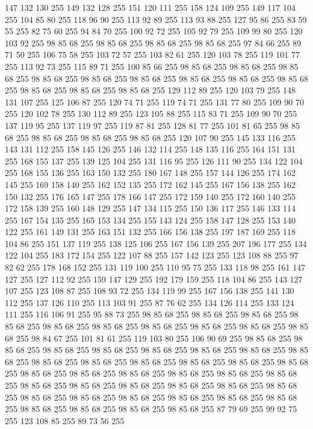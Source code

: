 147 132 130 255 149 132 128 255 151 120 111 255 158 124 109 255 149 117 104 255 104 85 80 255 118 96 90 255 113 92 89 255 113 93 88 255 127 95 86 255 83 59 55 255 82 75 60 255 94 84 70 255 100 92 72 255 105 92 79 255 109 99 80 255 120 103 92 255 98 85 68 255 98 85 68 255 98 85 68 255 98 85 68 255 97 84 66 255 89 71 50 255 106 75 58 255 103 72 57 255 103 82 61 255 120 103 78 255 119 101 77 255 113 92 73 255 115 89 71 255 100 85 66 255 98 85 68 255 98 85 68 255 98 85 68 255 98 85 68 255 98 85 68 255 98 85 68 255 98 85 68 255 98 85 68 255 98 85 68 255 98 85 68 255 98 85 68 255 98 85 68 255 129 112 89 255 120 103 79 255 148 131 107 255 125 106 87 255 120 74 71 255 119 74 71 255 131 77 80 255 109 90 70 255 120 102 78 255 130 112 89 255 123 105 88 255 115 83 71 255 109 90 70 255 137 119 95 255 137 119 97 255 119 87 81 255 128 81 77 255 101 81 65 255 98 85 68 255 98 85 68 255 98 85 68 255
98 85 68 255 120 107 90 255 145 133 116 255 143 131 112 255 158 145 126 255 146 132 114 255 148 135 116 255 164 151 131 255 168 155 137 255 139 125 104 255 131 116 95 255 126 111 90 255 134 122 104 255 168 155 136 255 163 150 132 255 180 167 148 255 157 144 126 255 174 162 145 255 169 158 140 255 162 152 135 255 172 162 145 255 167 156 138 255 162 150 132 255 176 165 147 255 178 166 147 255 172 159 140 255 172 160 140 255 172 158 139 255 160 148 129 255 147 134 115 255 150 136 117 255 146 133 114 255 167 154 135 255 165 153 134 255 155 143 124 255 158 147 128 255 153 140 122 255 161 149 131 255 163 151 132 255 166 156 138 255 197 187 169 255 118 104 86 255 151 137 119 255 138 125 106 255 167 156 139 255 207 196 177 255 134 122 104 255 183 172 154 255 122 107 88 255 157 142 123 255 123 108 88 255 97 82 62 255 178 168 152 255 131 119 100 255 110 95 75 255 133 118 98 255 161 147 127 255 127 112 92 255 159 147 129 255 192 179 159 255 118 104 86 255 143 127 107 255 123 108 87 255 108 93 72 255
134 119 99 255 167 156 138 255 141 130 112 255 137 126 110 255 113 103 91 255 87 76 62 255 134 126 114 255 133 124 111 255 116 106 91 255 95 88 73 255 98 85 68 255 98 85 68 255 98 85 68 255 98 85 68 255 98 85 68 255 98 85 68 255 98 85 68 255 98 85 68 255 98 85 68 255 98 85 68 255 98 84 67 255 101 81 61 255 119 103 80 255 106 90 69 255 98 85 68 255 98 85 68 255 98 85 68 255 98 85 68 255 98 85 68 255 98 85 68 255 98 85 68 255 98 85 68 255 98 85 68 255 98 85 68 255 98 85 68 255 98 85 68 255 98 85 68 255 98 85 68 255 98 85 68 255 98 85 68 255 98 85 68 255 98 85 68 255 98 85 68 255 98 85 68 255 98 85 68 255 98 85 68 255 98 85 68 255 98 85 68 255 98 85 68 255 98 85 68 255 98 85 68 255 98 85 68 255 98 85 68 255 98 85 68 255 98 85 68 255 98 85 68 255 98 85 68 255 98 85 68 255 98 85 68 255 98 85 68 255 87 79 69 255 99 92 75 255 123 108 85 255 89 73 56 255
